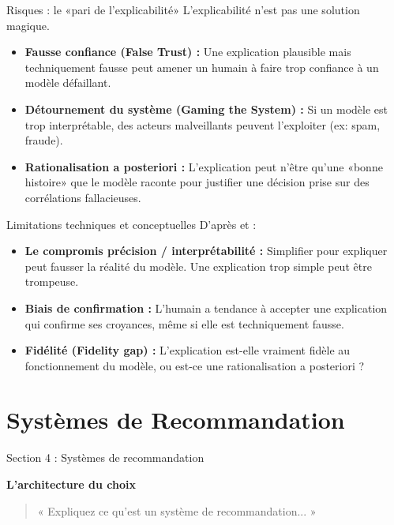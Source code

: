 \documentclass[9pt, aspectratio=169]{beamer}
\begin{document}
\begin{frame}{Risques : le «pari de l'explicabilité»}
    L'explicabilité n'est pas une solution magique.
    \begin{itemize}
        \item \textbf{Fausse confiance (False Trust) :} Une explication plausible mais techniquement fausse peut amener un humain à faire trop confiance à un modèle défaillant.
        \item \textbf{Détournement du système (Gaming the System) :} Si un modèle est trop interprétable, des acteurs malveillants peuvent l'exploiter (ex: spam, fraude).
        \item \textbf{Rationalisation a posteriori :} L'explication peut n'être qu'une «bonne histoire» que le modèle raconte pour justifier une décision prise sur des corrélations fallacieuses.
    \end{itemize}
\end{frame}

\begin{frame}{Limitations techniques et conceptuelles}
    D'après \textcite{Doran2017} et \textcite{Burkart2021} :
    \begin{itemize}
        \item \textbf{Le compromis précision / interprétabilité :} Simplifier pour expliquer peut fausser la réalité du modèle. Une explication trop simple peut être trompeuse.
        \item \textbf{Biais de confirmation :} L'humain a tendance à accepter une explication qui confirme ses croyances, même si elle est techniquement fausse.
        \item \textbf{Fidélité (Fidelity gap) :} L'explication est-elle vraiment fidèle au fonctionnement du modèle, ou est-ce une rationalisation a posteriori ?
    \end{itemize}
\end{frame}

\section{Systèmes de Recommandation}

\begin{frame}{Section 4 : Systèmes de recommandation}
    \begin{center}
        \Large \textbf{L'architecture du choix}
    \end{center}
    \vspace{1cm}
    \begin{quote}
        « Expliquez ce qu'est un système de recommandation... »
    \end{quote}
\end{frame}
\end{document}
